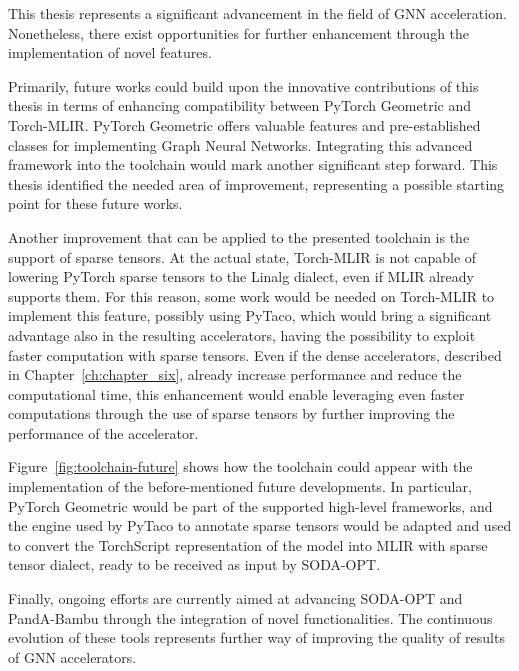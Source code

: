 This thesis represents a significant advancement in the field of GNN acceleration.
Nonetheless, there exist opportunities for further enhancement through the implementation of novel features.

Primarily, future works could build upon the innovative contributions of this thesis in terms of enhancing compatibility between PyTorch Geometric and Torch-MLIR\@.
PyTorch Geometric offers valuable features and pre-established classes for implementing Graph Neural Networks.
Integrating this advanced framework into the toolchain would mark another significant step forward.
This thesis identified the needed area of improvement, representing a possible starting point for these future works.

Another improvement that can be applied to the presented toolchain is the support of sparse tensors.
At the actual state, Torch-MLIR is not capable of lowering PyTorch sparse tensors to the Linalg dialect, even if MLIR already supports them.
For this reason, some work would be needed on Torch-MLIR to implement this feature, possibly using PyTaco, which would bring a significant advantage also in the resulting accelerators, having the possibility to exploit faster computation with sparse tensors.
Even if the dense accelerators, described in Chapter~\ref{ch:chapter_six}, already increase performance and reduce the computational time, this enhancement would enable leveraging even faster computations through the use of sparse tensors by further improving the performance of the accelerator.

Figure~\ref{fig:toolchain-future} shows how the toolchain could appear with the implementation of the before-mentioned future developments.
In particular, PyTorch Geometric would be part of the supported high-level frameworks, and the engine used by PyTaco to annotate sparse tensors would be adapted and used to convert the TorchScript representation of the model into MLIR with sparse tensor dialect, ready to be received as input by SODA-OPT\@.

Finally, ongoing efforts are currently aimed at advancing SODA-OPT and PandA-Bambu through the integration of novel functionalities.
The continuous evolution of these tools represents further way of improving the quality of results of GNN accelerators.